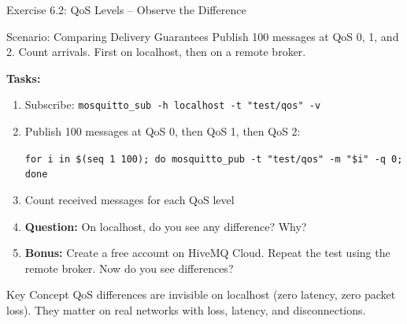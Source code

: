 \documentclass[aspectratio=169,11pt]{beamer}
\begin{document}
\begin{frame}{Exercise 6.2: QoS Levels -- Observe the Difference}
    \begin{block}{Scenario: Comparing Delivery Guarantees}
        Publish 100 messages at QoS 0, 1, and 2. Count arrivals. First on localhost, then on a remote broker.
    \end{block}

    \vspace{0.2cm}
    \textbf{Tasks:}
    \begin{enumerate}
        \item Subscribe: {\scriptsize\texttt{mosquitto\_sub -h localhost -t "test/qos" -v}}
        \item Publish 100 messages at QoS 0, then QoS 1, then QoS 2:

            {\scriptsize\texttt{for i in \$(seq 1 100); do mosquitto\_pub -t "test/qos" -m "\$i" -q 0; done}}
        \item Count received messages for each QoS level
        \item \textbf{Question:} On localhost, do you see any difference? Why?
        \item \textbf{Bonus:} Create a free account on HiveMQ Cloud. Repeat the test using the remote broker. Now do you see differences?
    \end{enumerate}

    \vspace{0.1cm}
    \begin{alertblock}{Key Concept}
        QoS differences are invisible on localhost (zero latency, zero packet loss). They matter on real networks with loss, latency, and disconnections.
    \end{alertblock}
\end{frame}
\end{document}
